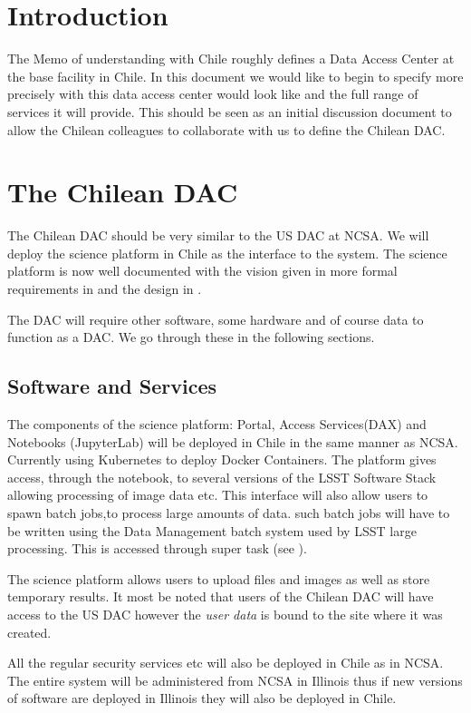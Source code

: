 \section{Introduction}


The Memo of understanding with Chile roughly defines a Data Access Center at the base facility in Chile.
In this document we would like to begin to specify more precisely with this data access center would look like and
the full range of services it will provide. This should be seen as an initial discussion document to allow the Chilean colleagues to collaborate with us to define the Chilean DAC.

\section{The Chilean DAC}

The Chilean DAC should be very similar to the US DAC at NCSA. We will deploy the  science platform in Chile as the interface to the system. The science platform is now well documented with the vision  given in 
more formal requirements in  and the design in .

The DAC will require other software, some  hardware and of course data to function as a DAC. We go through these in the following sections.


\subsection{Software and Services }
The components of the science platform: Portal, Access Services(DAX) and Notebooks (JupyterLab) will be deployed in Chile in the same manner as NCSA. Currently using Kubernetes to deploy Docker Containers.
The platform gives access, through the notebook, to several versions of the LSST Software Stack allowing processing of image data etc. This interface will also allow users to spawn batch jobs,to process large amounts of data. such batch jobs will have to be written using the Data Management batch system used by LSST large processing. This is accessed through super task (see ).

The science platform allows users to upload files and images as well as store temporary results. It most be noted that users of the Chilean DAC will have access to the US DAC however the \emph{user data} is bound to the site where it was created.

All the regular security services etc will also be deployed in Chile as in NCSA. The entire system will be administered from NCSA in Illinois thus if new versions of software are deployed in Illinois they will also be deployed in Chile.

